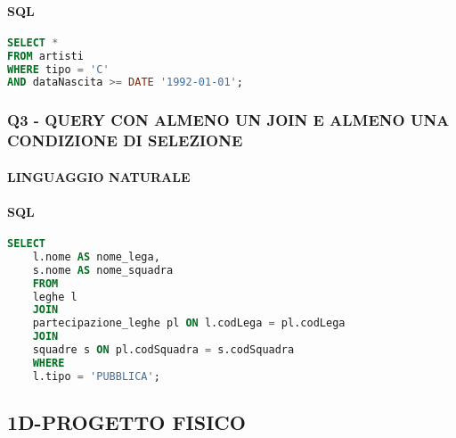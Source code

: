 \documentclass[a4paper]{article}
\begin{document}

\paragraph*{SQL \\}

\begin{lstlisting}[language=SQL]
SELECT *
FROM artisti
WHERE tipo = 'C'
AND dataNascita >= DATE '1992-01-01';
\end{lstlisting}


\subsubsection{Q3 - QUERY CON ALMENO UN JOIN E ALMENO UNA CONDIZIONE DI SELEZIONE\\ }

\paragraph*{LINGUAGGIO NATURALE\\}


\paragraph*{SQL \\}

\begin{lstlisting}[language=SQL]
	SELECT 
	l.nome AS nome_lega,
	s.nome AS nome_squadra
	FROM 
	leghe l
	JOIN 
	partecipazione_leghe pl ON l.codLega = pl.codLega
	JOIN 
	squadre s ON pl.codSquadra = s.codSquadra
	WHERE 
	l.tipo = 'PUBBLICA';
\end{lstlisting}


\subsection{1D-PROGETTO FISICO\\}
\end{document}
